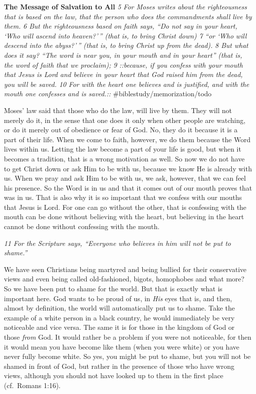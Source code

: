 \textbf{The Message of Salvation to All} \emph{5 For Moses writes about
the righteousness that is based on the law, that the person who does the
commandments shall live by them. 6 But the righteousness based on faith
says, ``Do not say in your heart, `Who will ascend into heaven?'\,''
(that is, to bring Christ down) 7 ``or `Who will descend into the
abyss?'\,'' (that is, to bring Christ up from the dead). 8 But what does
it say? ``The word is near you, in your mouth and in your heart'' (that
is, the word of faith that we proclaim); 9 ::because, if you confess
with your mouth that Jesus is Lord and believe in your heart that God
raised him from the dead, you will be saved. 10 For with the heart one
believes and is justified, and with the mouth one confesses and is
saved.::} \#biblestudy/memorization/todo

Moses' law said that those who do the law, will live by them. They will
not merely do it, in the sense that one does it only when other people
are watching, or do it merely out of obedience or fear of God. No, they
do it because it is a part of their life. When we come to faith,
however, we do them because the Word lives within us. Letting the law
become a part of your life is good, but when it becomes a tradition,
that is a wrong motivation as well. So now we do not have to get Christ
down or ask Him to be with us, because we know He is already with us.
When we pray and ask Him to be with us, we ask, however, that we can
feel his presence. So the Word is in us and that it comes out of our
mouth proves that was in us. That is also why it is so important that we
confess with our mouths that Jesus is Lord. For one can go without the
other, that is confessing with the mouth can be done without believing
with the heart, but believing in the heart cannot be done without
confessing with the mouth.

\emph{11 For the Scripture says, ``Everyone who believes in him will not
be put to shame.''}

We have seen Christians being martyred and being bullied for their
conservative views and even being called old-fashioned, bigots,
homophobes and what more? So we have been put to shame for the world.
But that is exactly what is important here. God wants to be proud of us,
in \emph{His} eyes that is, and then, almost by definition, the world
will automatically put us to shame. Take the example of a white person
in a black country, he would immediately be very noticeable and vice
versa. The same it is for those in the kingdom of God or those
\emph{from} God. It would rather be a problem if you were not
noticeable, for then it would mean you have become like them (when you
were white) or you have never fully become white. So yes, you might be
put to shame, but you will not be shamed in front of God, but rather in
the presence of those who have wrong views, although you should not have
looked up to them in the first place (cf.~Romans 1:16).

